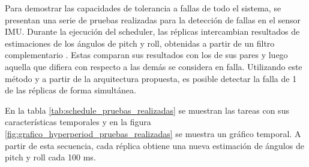 


Para demostrar las capacidades de tolerancia a fallas de todo el sistema, se presentan una serie de pruebas realizadas para la detección de fallas en el sensor IMU. Durante la ejecución del scheduler, las réplicas intercambian resultados de estimaciones de los ángulos de pitch y roll, obtenidas a partir de un filtro complementario \cite{Pose2014}. Estas comparan sus resultados con los de sus pares y luego aquella que difiera con respecto a las demás se considera en falla. Utilizando este método y a partir de la arquitectura propuesta, es posible detectar la falla de 1 de las réplicas de forma simultánea.

En la tabla \ref{tab:schedule_pruebas_realizadas} se muestran las tareas con sus características temporales y en la figura \ref{fig:grafico_hyperperiod_pruebas_realizadas} se muestra un gráfico temporal. A partir de esta secuencia, cada réplica obtiene una nueva estimación de ángulos de pitch y roll cada 100 ms.

